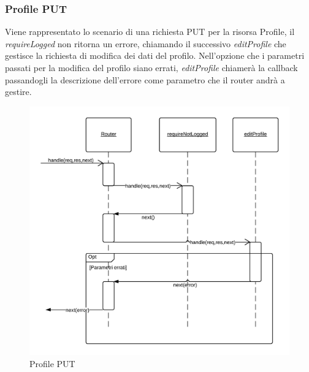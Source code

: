 \subsubsection{Profile PUT} 
Viene rappresentato lo scenario di una richiesta PUT per la risorsa Profile, il \emph{requireLogged} non ritorna un errore, chiamando il successivo  \emph{editProfile} che gestisce la richiesta di modifica dei dati del profilo.
Nell'opzione che i parametri passati per la modifica del profilo siano errati, \emph{editProfile} chiamerà la callback passandogli la descrizione dell'errore come parametro che il router andrà a gestire.
\begin{figure}[H]
	\begin{center} 
		\includegraphics[scale=0.20]{scenari/Profile PUT.png} 
		\caption{Profile PUT}
	\end{center} 
\end{figure}

